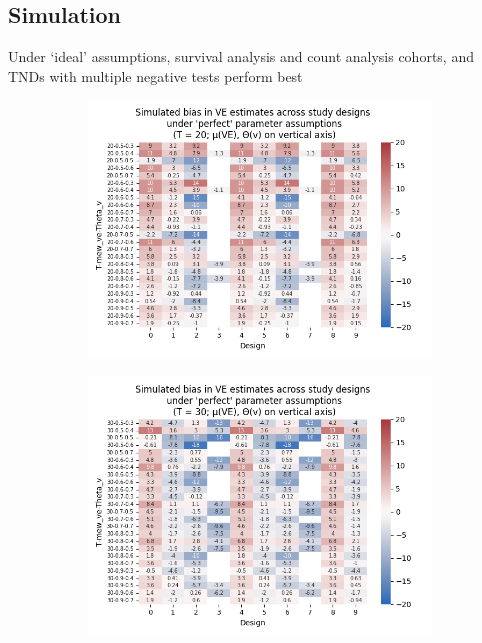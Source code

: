 \documentclass[aspectratio=169]{beamer}
\begin{document}
\subsection{Simulation}
\begin{frame}{Under `ideal' assumptions, survival analysis and count analysis cohorts, and TNDs with multiple negative tests perform best}
	\begin{figure}[H]
		\begin{subfigure}[c]{0.31\linewidth}
			\centering
			\includegraphics[scale=0.28]{VEMethod_Sim1b_PureDesignBias_Heatmap20.png}
		\end{subfigure}
		\begin{subfigure}[c]{0.31\linewidth}
			\centering
			\includegraphics[scale=0.28]{VEMethod_Sim1b_PureDesignBias_Heatmap30.png}

\end{subfigure}
\end{figure}
\end{frame}
\end{document}
